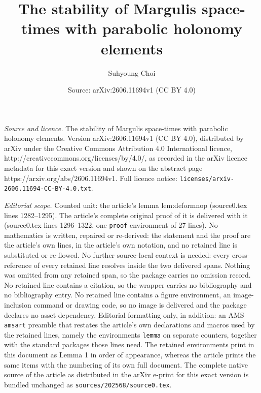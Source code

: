 \documentclass[10pt,a4paper]{amsart}
\title{The stability of Margulis space-times with parabolic holonomy elements}
\author{Suhyoung Choi}
\date{Source: arXiv:2606.11694v1 (CC BY 4.0)}
\begin{document}
\maketitle

\noindent\emph{Source and licence.} The stability of Margulis space-times with parabolic holonomy elements. Version arXiv:2606.11694v1 (CC BY 4.0), distributed by arXiv under the Creative Commons Attribution 4.0 International licence, http://creativecommons.org/licenses/by/4.0/, as recorded in the arXiv licence metadata for this exact version and shown on the abstract page https://arxiv.org/abs/2606.11694v1. Full licence notice: \texttt{licenses/arxiv-2606.11694-CC-BY-4.0.txt}.\par\smallskip

\noindent\textit{Editorial scope.} Counted unit: the article's lemma lem:deformnop (source0.tex lines 1282--1295). The article's complete original proof of it is delivered with it (source0.tex lines 1296--1322, one \texttt{proof} environment of 27 lines). No mathematics is written, repaired or re-derived: the statement and the proof are the article's own lines, in the article's own notation, and no retained line is substituted or re-flowed.  No further source-local context is needed: every cross-reference of every retained line resolves inside the two delivered spans.  Nothing was omitted from any retained span, so the package carries no omission record.  No retained line contains a citation, so the wrapper carries no bibliography and no bibliography entry.  No retained line contains a figure environment, an image-inclusion command or drawing code, so no image is delivered and the package declares no asset dependency.  Editorial formatting only, in addition: an AMS \texttt{amsart} preamble that restates the article's own declarations and macros used by the retained lines, namely the environments \texttt{lemma} on separate counters, together with the standard packages those lines need.  The retained environments print in this document as Lemma 1 in order of appearance, whereas the article prints the same items with the numbering of its own full document.  The complete native source of the article as distributed in the arXiv e-print for this exact version is bundled unchanged as \texttt{sources/202568/source0.tex}.
\end{document}
